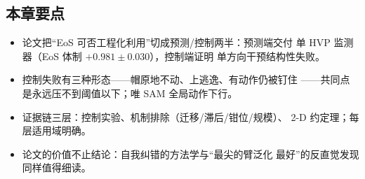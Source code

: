 \subsection*{本章要点}
\begin{itemize}
  \item 论文把``EoS 可否工程化利用''切成预测/控制两半：预测端交付
        单 HVP 监测器（EoS 体制 $+0.981\pm0.030$），控制端证明
        单方向干预结构性失败。
  \item 控制失败有三种形态——帽原地不动、上逃逸、有动作仍被钉住
        ——共同点是永远压不到阈值以下；唯 SAM 全局动作下行。
  \item 证据链三层：控制实验、机制排除（迁移/滞后/钳位/规模）、
        2-D 约定理；每层适用域明确。
  \item 论文的价值不止结论：自我纠错的方法学与``最尖的臂泛化
        最好''的反直觉发现同样值得细读。
\end{itemize}
